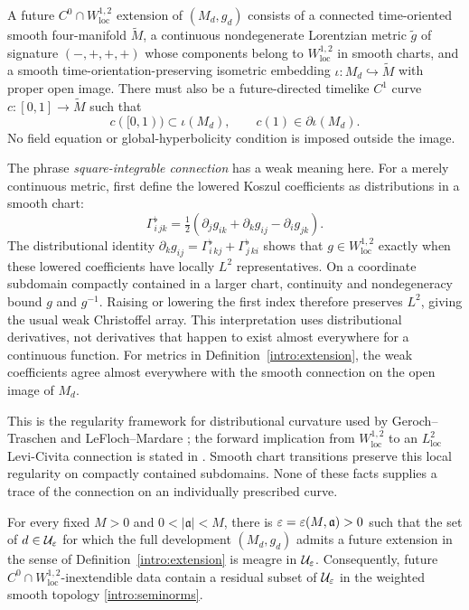\begin{definition}\label{intro:extension}
A future $C^0\cap W^{1,2}_{\mathrm{loc}}$ extension of $(M_d,g_d)$
consists of a connected time-oriented smooth four-manifold
$\widetilde M$, a continuous nondegenerate Lorentzian metric
$\widetilde g$ of signature $(-,+,+,+)$ whose components belong to
$W^{1,2}_{\mathrm{loc}}$ in smooth charts, and a smooth
time-orientation-preserving isometric embedding
$\iota:M_d\hookrightarrow\widetilde M$ with proper open image.
There must also be a future-directed timelike $C^1$ curve
$c:[0,1]\to\widetilde M$ such that
\[
 c([0,1))\subset\iota(M_d),
 \qquad c(1)\in\partial\iota(M_d).
\]
No field equation or global-hyperbolicity condition is imposed outside
the image.
\end{definition}

The phrase \emph{square-integrable connection} has a weak meaning here.
For a merely continuous metric, first define the lowered Koszul
coefficients as distributions in a smooth chart:
\[
 \Gamma^{\flat}_{i\,jk}
 =\tfrac12(\partial_j g_{ik}+\partial_k g_{ij}-\partial_i g_{jk}).
\]
The distributional identity
$\partial_k g_{ij}=\Gamma^{\flat}_{i\,kj}+\Gamma^{\flat}_{j\,ki}$
shows that $g\in W^{1,2}_{\mathrm{loc}}$ exactly when these lowered
coefficients have locally $L^2$ representatives. On a coordinate
subdomain compactly contained in a larger chart, continuity and
nondegeneracy bound $g$ and $g^{-1}$. Raising or lowering the first
index therefore preserves $L^2$, giving the usual weak Christoffel
array. This interpretation uses distributional derivatives, not
derivatives that happen to exist almost everywhere for a continuous
function. For metrics in Definition~\ref{intro:extension}, the weak
coefficients agree almost everywhere with the smooth connection on
the open image of $M_d$.

This is the regularity framework for distributional curvature used by
Geroch--Traschen and LeFloch--Mardare
\cite{GerochTraschen1987,LeFlochMardare2007}; the forward implication
from $W^{1,2}_{\mathrm{loc}}$ to an $L^2_{\mathrm{loc}}$ Levi-Civita
connection is stated in \cite[Proposition~4.4]{LeFlochMardare2007}.
Smooth chart transitions preserve this local regularity on compactly
contained subdomains. None of these facts supplies a trace of the
connection on an individually prescribed curve.

\begin{theorem}\label{thm:main}
For every fixed $M>0$ and $0<|\mathfrak a|<M$, there is
$\varepsilon=\varepsilon(M,\mathfrak a)>0$ such that the set of $d\in\mathcal U_{\varepsilon}$ for which the
full development $(M_d,g_d)$ admits a future extension in the sense
of Definition~\ref{intro:extension} is meagre in $\mathcal U_{\varepsilon}$.
Consequently, future $C^0\cap W^{1,2}_{\mathrm{loc}}$-inextendible
data contain a residual subset of $\mathcal U_{\varepsilon}$ in the weighted smooth
topology \eqref{intro:seminorms}.
\end{theorem}


